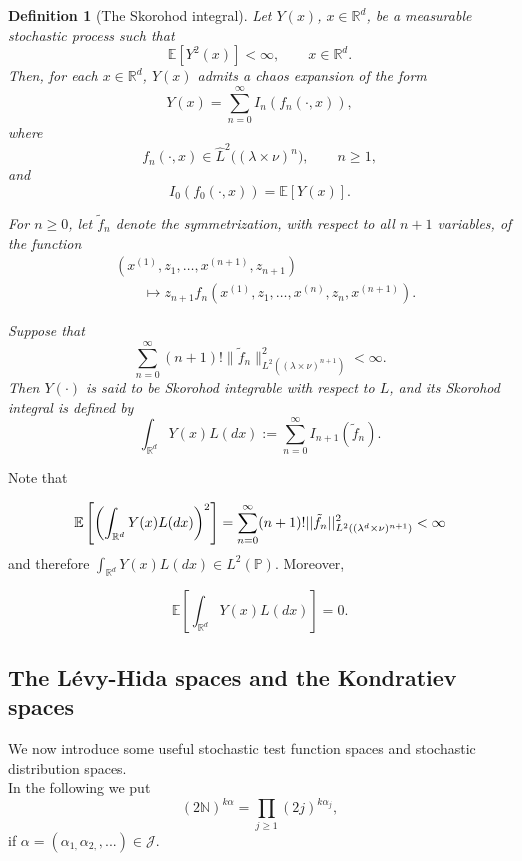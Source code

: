 \documentclass[12pt]{article}%
\newcommand{\E}{E}
\newtheorem{definition}[theorem]{Definition}
\numberwithin{equation}{section}
\def\P{\mathbb{P}}
\def\R{\mathbb{R}}
\def\E{\mathbb{E}}
\begin{document}
\begin{definition}[The Skorohod integral]
\label{Skoro}
Let $Y(x)$, $x\in\mathbb{R}^d$, be a measurable stochastic process
such that
\[
\mathbb{E}[Y^2(x)]<\infty,
\qquad x\in\mathbb{R}^d.
\]
Then, for each $x\in\mathbb{R}^d$, $Y(x)$ admits a chaos expansion
of the form
\[
Y(x)=\sum_{n=0}^{\infty}I_n(f_n(\cdot,x)),
\]
where
\[
f_n(\cdot,x)\in
\widehat{L}^2\big((\lambda\times\nu)^n\big),
\qquad n\geq 1,
\]
and
\[
I_0(f_0(\cdot,x))=\mathbb{E}[Y(x)].
\]

For $n\geq 0$, let $\widetilde{f}_n$ denote the symmetrization, with
respect to all $n+1$ variables, of the function
\[
\begin{aligned}
&(x^{(1)},z_1,\ldots,x^{(n+1)},z_{n+1})
\\
&\qquad\longmapsto
z_{n+1}
f_n(x^{(1)},z_1,\ldots,x^{(n)},z_n,x^{(n+1)}).
\end{aligned}
\]

Suppose that
\[
\sum_{n=0}^{\infty}
(n+1)!
\|\widetilde{f}_n\|^2_{
L^2((\lambda\times\nu)^{n+1})}
<\infty.
\]
Then $Y(\cdot)$ is said to be \emph{Skorohod integrable} with respect
to $L$, and its Skorohod integral is defined by
\begin{equation}
\label{Skor}
\int_{\mathbb{R}^d}Y(x)L(dx)
:=
\sum_{n=0}^{\infty}
I_{n+1}(\widetilde{f}_n).
\end{equation}
\end{definition}

Note that 

$${\rm
\E}\left[\left(\int_{\R^d}Y(x)L(dx)\right)^2\right]=\sum_{n=0}^\infty(n+1)!||\tilde{f}_n||^2_{L^2((\lambda^d\times\nu)^{n+1})}<\infty$$
and therefore $\int_{\R^d}Y(x)L(dx)\in L^2(\P)$. Moreover, 

$$\E \left[\int_{\R^d}Y(x)L(dx)\right]=0.$$




\subsection{The L\'{e}vy-Hida spaces and the Kondratiev spaces}
We now introduce some useful stochastic test function spaces and stochastic distribution spaces.\\

In the following we put
\begin{equation}
(2\mathbb{N})^{k\alpha }=\prod_{j\geq 1}(2j)^{k\alpha _{j}},
\end{equation}%
if $\alpha =(\alpha _{1,}\alpha _{2,},...)\in \mathcal{J}$.
\end{document}

